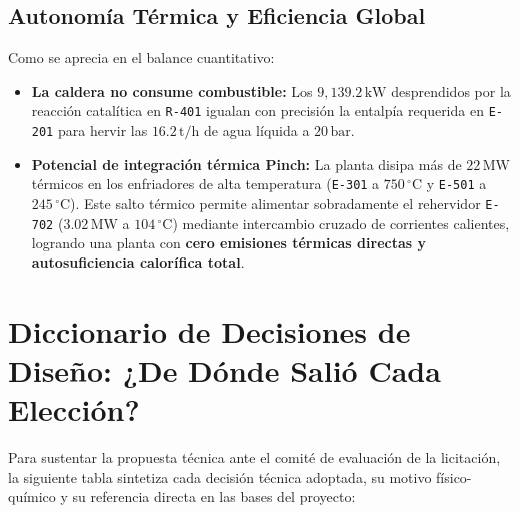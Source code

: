 \documentclass[11pt,a4paper]{article}
\begin{document}
\subsection{Autonomía Térmica y Eficiencia Global}
Como se aprecia en el balance cuantitativo:
\begin{itemize}
    \item \textbf{La caldera no consume combustible:} Los $9{,}139.2\,\text{kW}$ desprendidos por la reacción catalítica en \texttt{R-401} igualan con precisión la entalpía requerida en \texttt{E-201} para hervir las $16.2\,\text{t/h}$ de agua líquida a $20\,\text{bar}$.
    \item \textbf{Potencial de integración térmica Pinch:} La planta disipa más de $22\,\text{MW}$ térmicos en los enfriadores de alta temperatura (\texttt{E-301} a $750\,^\circ\text{C}$ y \texttt{E-501} a $245\,^\circ\text{C}$). Este salto térmico permite alimentar sobradamente el rehervidor \texttt{E-702} ($3.02\,\text{MW}$ a $104\,^\circ\text{C}$) mediante intercambio cruzado de corrientes calientes, logrando una planta con \textbf{cero emisiones térmicas directas y autosuficiencia calorífica total}.
\end{itemize}

\section{Diccionario de Decisiones de Diseño: ¿De Dónde Salió Cada Elección?}

Para sustentar la propuesta técnica ante el comité de evaluación de la licitación, la siguiente tabla sintetiza cada decisión técnica adoptada, su motivo físico-químico y su referencia directa en las bases del proyecto:
\end{document}
